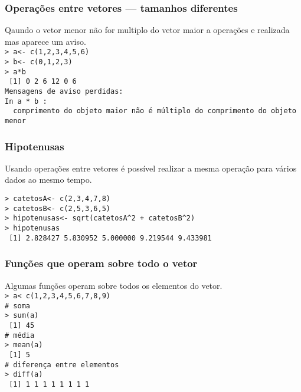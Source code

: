 \documentclass{beamer}
\begin{document}
 \begin{frame}
   \frametitle{Operações entre vetores --- tamanhos diferentes}

Qaundo o vetor menor não for multiplo do vetor maior a operações e realizada mas aparece um aviso.\\
\texttt{> a<- c(1,2,3,4,5,6)\\
> b<- c(0,1,2,3)\\
> a*b\\
~[1]  0  2  6 12  0  6\\
Mensagens de aviso perdidas:\\
In a * b :\\
~  comprimento do objeto maior não é múltiplo do comprimento do objeto menor}
 \end{frame}

 \begin{frame}
   \frametitle{Hipotenusas}
Usando operações entre vetores é possível realizar a mesma operação para vários dados ao mesmo tempo.

\texttt{> catetosA<- c(2,3,4,7,8)\\
> catetosB<- c(2,5,3,6,5)\\
> hipotenusas<- sqrt(catetosA\^{}2 + catetosB\^{}2)\\
> hipotenusas\\
~[1] 2.828427 5.830952 5.000000 9.219544 9.433981}
 \end{frame}

 \begin{frame}
   \frametitle{Funções que operam sobre todo o vetor}

Algumas funções operam sobre todos os elementos do vetor.
\\
\texttt{> a< c(1,2,3,4,5,6,7,8,9)\\\vspace{10pt}
\# soma\\
> sum(a)\\
~[1] 45\\ \vspace{10pt}
\# média\\
> mean(a)\\
~[1] 5\\ \vspace{10pt}
\# diferença entre elementos\\ 
> diff(a)\\
~[1] 1 1 1 1 1 1 1 1\\ \vspace{10pt} \pause
}
 \end{frame}
\end{document}

